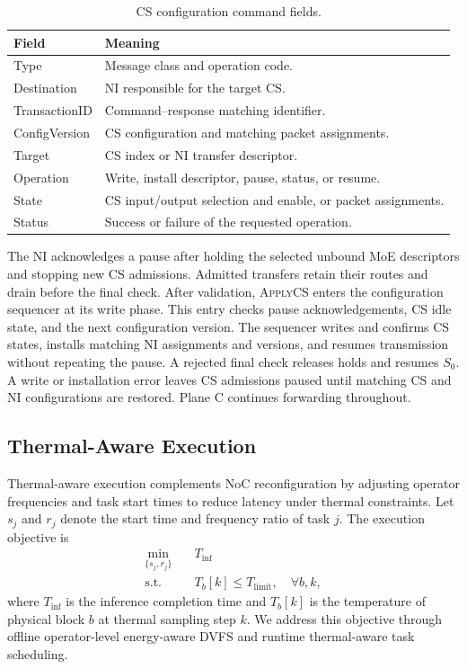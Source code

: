 \documentclass[conference,10pt]{IEEEtran}
\begin{document}
\begin{table}[!t]
  \caption{CS configuration command fields.}
  \label{tab:noc-command-fields}
  \centering\small
  \begin{tabularx}{\columnwidth}{@{}p{}>{\raggedright\arraybackslash}X@{}}
    \hline
    Field & Meaning \\
    \hline
    Type & Message class and operation code. \\
    Destination & NI responsible for the target CS. \\
    TransactionID & Command--response matching identifier. \\
    ConfigVersion & CS configuration and matching packet assignments. \\
    Target & CS index or NI transfer descriptor. \\
    Operation & Write, install descriptor, pause, status, or resume. \\
    State & CS input/output selection and enable, or packet assignments. \\
    Status & Success or failure of the requested operation. \\
    \hline
  \end{tabularx}
\end{table}

The NI acknowledges a pause after holding the selected unbound MoE
descriptors and stopping new CS admissions. Admitted transfers retain
their routes and drain before the final check. After validation,
\textsc{ApplyCS} enters the configuration sequencer at its write phase.
This entry checks pause acknowledgements, CS idle state, and the next
configuration version. The sequencer writes and confirms CS states,
installs matching NI assignments and versions, and resumes transmission
without repeating the pause. A rejected final check releases holds and
resumes $S_0$. A write or installation error leaves CS admissions paused
until matching CS and NI configurations are restored. Plane C continues
forwarding throughout.

\subsection{Thermal-Aware Execution}
\label{sec:thermal-design}

Thermal-aware execution complements NoC reconfiguration
by adjusting operator frequencies and
task start times to reduce latency under thermal constraints.
Let $s_j$ and $r_j$ denote the start time and frequency
ratio of task $j$. The execution objective is
\begin{equation}
\begin{aligned}
  \min_{\{s_j,r_j\}} \quad & T_{\mathrm{inf}} \\
  \mathrm{s.t.}\quad
  & T_b[k]\leq T_{\mathrm{limit}},\quad \forall b,k,
\end{aligned}
\label{eq:thermal-optimization}
\end{equation}
where $T_{\mathrm{inf}}$ is the inference completion time
and $T_b[k]$ is the temperature of physical block $b$ at
thermal sampling step $k$.
We address this objective through offline operator-level
energy-aware DVFS and runtime thermal-aware task scheduling.
\end{document}
